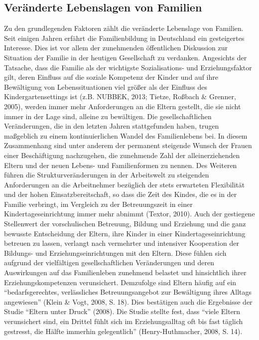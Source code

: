 \documentclass[12pt,a4paper]{article}
\begin{document}
\subsection{Veränderte Lebenslagen von Familien}
Zu den grundlegenden Faktoren zählt die veränderte Lebenslage von Familien. Seit einigen Jahren erfährt die Familienbildung in Deutschland ein gesteigertes Interesse. Dies ist vor allem der zunehmenden öffentlichen Diskussion zur Situation der Familie in der heutigen Gesellschaft zu verdanken. Angesichts der Tatsache, dass die Familie als der wichtigste Sozialisations- und Erziehungsfaktor gilt, deren Einfluss auf die soziale Kompetenz der Kinder und auf ihre Bewältigung von Lebenssituationen viel größer als der Einfluss des Kindergartensettings ist (z.B. NUBBEK, 2013; Tietze, Roßbach \& Grenner, 2005), werden immer mehr Anforderungen an die Eltern gestellt, die sie nicht immer in der Lage sind, alleine zu bewältigen. Die gesellschaftlichen Veränderungen, die in den letzten Jahren stattgefunden haben, trugen maßgeblich zu einem kontinuierlichen Wandel des Familienlebens bei. In diesem Zusammenhang sind unter anderem der permanent steigende Wunsch der Frauen einer Beschäftigung nachzugehen, die zunehmende Zahl der alleinerziehenden Eltern und der neuen Lebens- und Familienformen zu nennen.
Des Weiteren führen die Strukturveränderungen in der Arbeitswelt zu steigenden Anforderungen an die Arbeitnehmer bezüglich der stets erwarteten Flexibilität und der hohen Einsatzbereitschaft, so dass die Zeit des Kindes, die es in der Familie verbringt, im Vergleich zu der Betreuungszeit in einer Kindertageseinrichtung immer mehr abnimmt (Textor, 2010).	
Auch der gestiegene Stellenwert der vorschulischen Betreuung, Bildung und Erziehung und die ganz bewusste Entscheidung der Eltern, ihre Kinder in einer Kindertageseinrichtung betreuen zu lassen, verlangt nach vermehrter und intensiver Kooperation der Bildungs- und Erziehungseinrichtungen mit den Eltern. Diese fühlen sich aufgrund der vielfältigen gesellschaftlichen Veränderungen und deren Auswirkungen auf das Familienleben zunehmend belastet und hinsichtlich ihrer Erziehungskompetenzen verunsichert. Demzufolge sind Eltern häufig auf ein "`bedarfsgerechtes, verlässliches Betreuungsangebot zur Bewältigung ihres Alltags angewiesen"' (Klein \& Vogt, 2008, S. 18). Dies bestätigen auch die Ergebnisse der Studie "`Eltern unter Druck"' (2008). Die Studie stellte fest, dass "`viele Eltern verunsichert sind, ein Drittel fühlt sich im Erziehungsalltag oft bis fast täglich gestresst, die Hälfte immerhin gelegentlich"' (Henry-Huthmacher, 2008, S. 14).
\end{document}
